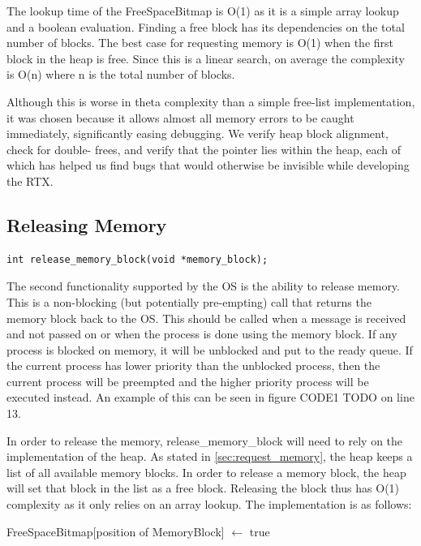 \documentclass[12pt]{report}
\begin{document}
The lookup time of the FreeSpaceBitmap is O(1) as it is a simple array lookup and a boolean evaluation. Finding a free block has its dependencies on the total number of blocks. The best case for requesting memory is O(1) when the first block in the heap is free. Since this is a linear search, on average the complexity is O(n) where n is the total number of blocks.

Although this is worse in theta complexity than a simple free-list implementation,
it was chosen because it allows almost all memory errors to be caught immediately,
significantly easing debugging. We verify heap block alignment, check for double-
frees, and verify that the pointer lies within the heap, each of which has helped
us find bugs that would otherwise be invisible while developing the RTX.

\bigskip

\subsection{Releasing Memory}
\begin{lstlisting}
int release_memory_block(void *memory_block);
\end{lstlisting}

\par The second functionality supported by the OS is the ability to release memory. This is a non-blocking (but potentially pre-empting) call that returns the memory block back to the OS. This should be called when a message is received and not passed on or when the process is done using the memory block. If any process is blocked on memory, it will be unblocked and put to the ready queue. If the current process has lower priority than the unblocked process, then the current process will be preempted and the higher priority process will be executed instead. An example of this can be seen in figure CODE1 TODO on line 13.

\par In order to release the memory, release\_memory\_block will need to rely on the implementation of the heap. As stated in \ref{sec:request_memory}, the heap keeps a list of all available memory blocks. In order to release a memory block, the heap will set that block in the list as a free block. Releasing the block thus has O(1) complexity as it only relies on an array lookup. The implementation is as follows:
\begin{algorithmic}
    \State FreeSpaceBitmap[position of MemoryBlock] $\gets$ true
  \EndFunction
\end{algorithmic}
\end{document}
